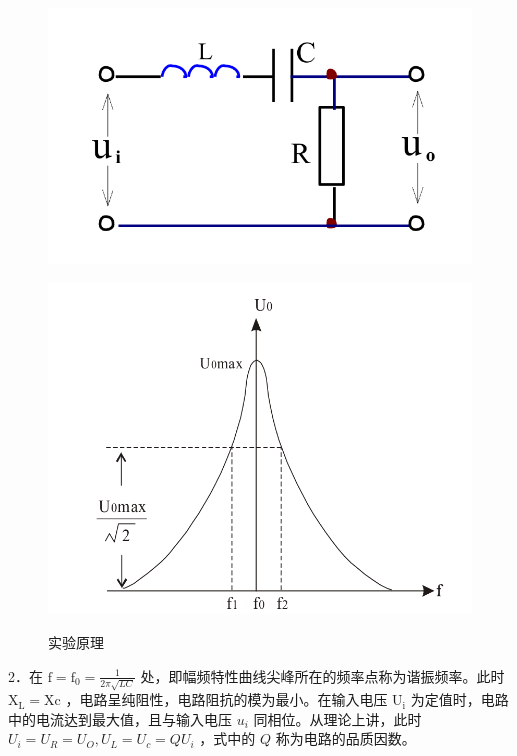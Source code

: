 \documentclass{article}
\begin{document}
\begin{figure}[h]
    \centering
    \begin{minipage}[t]{0.48\textwidth}
        \centering
        \includegraphics[width=\textwidth]{img1.png}
        \label{fig:amplitude_frequency_characteristic_1}
    \end{minipage}
    \hfill
    \begin{minipage}[t]{0.48\textwidth}
        \centering
        \includegraphics[width=\textwidth]{img2.png}
        \label{fig:amplitude_frequency_characteristic_2}
    \end{minipage}
    \caption{实验原理}
\end{figure}

2．在 $\mathrm{f}=\mathrm{f}_0=\frac{1}{2 \pi \sqrt{L C}}$ 处，即幅频特性曲线尖峰所在的频率点称为谐振频率。此时 $\mathrm{X}_{\mathrm{L}}=\mathrm{Xc}$ ，电路呈纯阻性，电路阻抗的模为最小。在输入电压 $\mathrm{U}_{\mathrm{i}}$ 为定值时，电路中的电流达到最大值，且与输入电压 $u_i$ 同相位。从理论上讲，此时 $U_i=U_R=U_O, U_L=U_c=Q U_i$ ，式中的 $Q$ 称为电路的品质因数。
\end{document}
